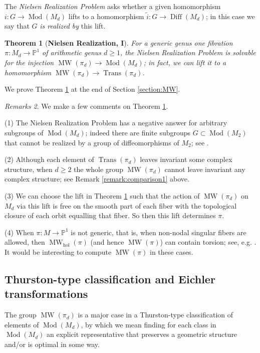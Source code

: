 \documentclass[10pt,letterpaper]{amsart}
\numberwithin{equation}{section}
\def\Pb{{\mathbb P}}
\def\hol{\mathrm{hol}}
\newcommand\Diff{\operatorname{Diff}}
\newcommand\Mod{\operatorname{Mod}}
\newcommand\MW{\operatorname{MW}}
\newcommand\Trans{\operatorname{Trans}}
\newtheorem{theorem}{Theorem}[section]
\theoremstyle{remark}
\newtheorem{remarks}[theorem]{Remarks}
\begin{document}
The {\em Nielsen Realization Problem} asks whether a given homomorphism  $i:G\to\Mod(M_d)$ 
lifts to a homomorphism  $\tilde{i}: G\to \Diff(M_d)$; in this case we say that $G$ {\em is realized by} this lift.   

\begin{theorem}[{\bf Nielsen Realization, I}]
\label{theorem:Nielsen1}
For a generic genus one fibration $\pi:M_d\to \Pb^1$ of arithmetic genus $d\ge 1$,  the Nielsen Realization Problem is solvable for the injection $\MW(\pi_d)\to \Mod(M_d)$;  in fact, we can lift it to a homomorphism  $\MW(\pi_d)\to \Trans(\pi_d)$.\end{theorem}

We prove Theorem \ref{theorem:Nielsen1} at the end of Section \ref{section:MW}.  

\begin{remarks} We make a few comments on Theorem \ref{theorem:Nielsen1}.

(1)  The Nielsen Realization Problem has a negative answer for arbitrary subgroups of $\Mod(M_d)$; indeed there are finite subgroups $G\subset \Mod(M_2)$ that cannot be realized by a group of diffeomorphisms of $M_2$; see \cite{FL1}.

(2) Although each element of $\Trans(\pi_d)$ leaves invariant some complex structure, when $d\geq 2$ the whole group $\MW(\pi_d)$ 
cannot leave invariant any complex structure; see Remark \ref{remark:comparison1} above. 

(3) We can choose the lift in Theorem \ref{theorem:Nielsen1}  such that 
the action of $\MW(\pi_d)$ on $M_d$ via this  lift is free on the smooth part of each fiber with the topological closure of each orbit equalling that fiber. So then this lift determines $\pi$.

(4) When $\pi:M\to\Pb^1$ is not generic, that is,  when non-nodal singular fibers are allowed, then $\MW_\hol(\pi)$ (and hence $\MW(\pi)$) can contain torsion; see, e.g. \cite{shioda}.  It would be interesting to compute $\MW(\pi)$ in these cases.   
\end{remarks}

\subsection{Thurston-type classification and Eichler transformations}
\label{subsect:Thurstontype} 

The group $\MW(\pi_d)$ is a major case in a Thurston-type classification of elements of $\Mod(M_d)$, by which we mean finding for each class in $\Mod(M_d)$ an explicit representative that preserves a geometric structure and/or is optimal in some way.  
\end{document}
